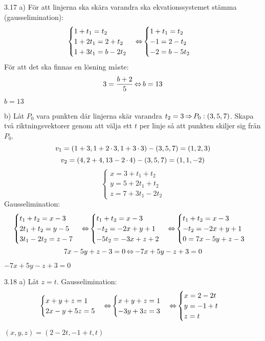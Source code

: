 \begin{task}{3.17 a)}
	För att linjerna ska skära varandra ska ekvationssystemet stämma (gausselimination):
	\[\begin{cases}
		1+t_1=t_2 \\
		1+2t_1=2+t_2 \\
		1+3t_1=b-2t_2
	\end{cases} \operatorname{\Leftrightarrow}
	\begin{cases}
		1+t_1=t_2 \\
		-1=2-t_2 \\
		-2=b-5t_2
	\end{cases}\]
	För att det ska finnas en lösning måste:
	\[3=\frac{b+2}{5} \operatorname{\Leftrightarrow}
	b=13\]

	\ans $b=13$
\end{task}

\begin{task}{b)}
	Låt $P_0$ vara punkten där linjerna skär varandra $t_2=3 \operatorname{\Rightarrow} P_0:(3,5,7)$.
	Skapa två riktningsvektorer genom att välja ett $t$ per linje så att punkten skiljer sig från $P_0$.
	\[v_1=(1+3,1+2\operatorname{\cdot}3,1+3\operatorname{\cdot}3)-(3,5,7)=(1,2,3)\]
	\[v_2=(4,2+4,13-2\operatorname{\cdot}4)-(3,5,7)=(1,1,-2)\]
	\[\begin{cases}
		x=3+t_1+t_2 \\
		y=5+2t_1+t_2 \\
		z=7+3t_1-2t_2
	\end{cases}\]
	Gausselimination:
	\[\begin{cases}
		t_1+t_2=x-3 \\
		2t_1+t_2=y-5 \\
		3t_1-2t_2=z-7
	\end{cases} \operatorname{\Leftrightarrow}
	\begin{cases}
		t_1+t_2=x-3 \\
		-t_2=-2x+y+1 \\
		-5t_2=-3x+z+2
	\end{cases} \operatorname{\Leftrightarrow}
	\begin{cases}
		t_1+t_2=x-3 \\
		-t_2=-2x+y+1 \\
		0=7x-5y+z-3
	\end{cases}\]
	\[7x-5y+z-3=0 \operatorname{\Leftrightarrow}
	-7x+5y-z+3=0\]

	\ans $-7x+5y-z+3=0$
\end{task}

\begin{task}{3.18 a)}
	Låt $z=t$. Gausselimination:
	\[\begin{cases}
		x+y+z=1 \\
		2x-y+5z=5
	\end{cases} \operatorname{\Leftrightarrow}
	\begin{cases}
		x+y+z=1 \\
		-3y+3z=3
	\end{cases} \operatorname{\Leftrightarrow}
	\begin{cases}
		x=2-2t \\
		y=-1+t \\
		z=t
	\end{cases}\]

	\ans $(x,y,z)=(2-2t,-1+t,t)$
\end{task}


